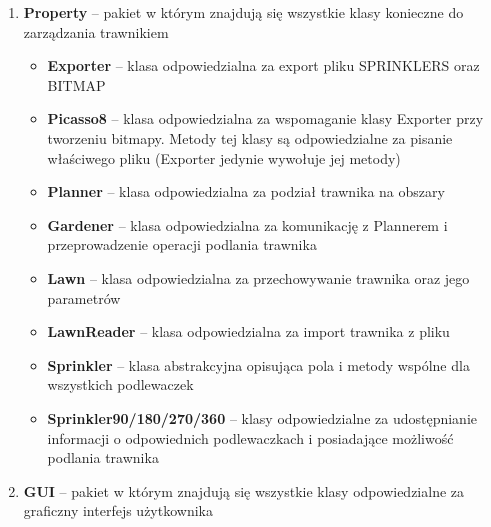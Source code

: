 \documentclass[12pt]{article}
\renewcommand{\_}{\kern-1.5pt\textunderscore\kern-1.5pt}
\begin{document}
\begin{enumerate}
	\item \textbf{Property }– pakiet w którym znajdują się wszystkie klasy konieczne do zarządzania trawnikiem\par

\begin{itemize}
	\item \textbf{Exporter} – klasa odpowiedzialna za export pliku SPRINKLERS oraz BITMAP\par

	\item \textbf{Picasso8} – klasa odpowiedzialna za wspomaganie klasy Exporter przy tworzeniu bitmapy. Metody tej klasy są odpowiedzialne za pisanie właściwego pliku (Exporter jedynie wywołuje jej metody)\par

	\item \textbf{Planner} – klasa odpowiedzialna za podział trawnika na obszary\par

	\item \textbf{Gardener} – klasa odpowiedzialna za komunikację z Plannerem i przeprowadzenie operacji podlania trawnika\par

	\item \textbf{Lawn} – klasa odpowiedzialna za przechowywanie trawnika oraz jego parametrów\par

	\item \textbf{LawnReader} – klasa odpowiedzialna za import trawnika z pliku\par

	\item \textbf{Sprinkler} – klasa abstrakcyjna opisująca pola i metody wspólne dla wszystkich podlewaczek\par

	\item \textbf{Sprinkler90/180/270/360} – klasy odpowiedzialne za udostępnianie informacji o odpowiednich podlewaczkach i posiadające możliwość podlania trawnika
\end{itemize}\par


\vspace{\baselineskip}
	\item \textbf{GUI} – pakiet w którym znajdują się wszystkie klasy odpowiedzialne za graficzny interfejs użytkownika\par


\end{enumerate}
\end{document}
